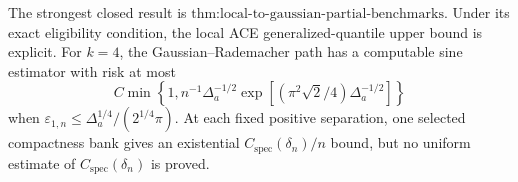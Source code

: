 The strongest closed result is \(\text{thm:local-to-gaussian-partial-benchmarks}\).  Under its exact eligibility condition, the local ACE generalized-quantile upper bound is explicit.  For \(k=4\), the Gaussian--Rademacher path has a computable sine estimator with risk at most
\[
 C\min\!\left\{1,n^{-1}\Delta_a^{-1/2}
 \exp\!\left[(\pi^2\sqrt2/4)\Delta_a^{-1/2}\right]\right\}
\]
when \(\varepsilon_{1,n}\le\Delta_a^{1/4}/(2^{1/4}\pi)\).  At each fixed positive separation, one selected compactness bank gives an existential \(C_{\mathrm{spec}}(\delta_n)/n\) bound, but no uniform estimate of \(C_{\mathrm{spec}}(\delta_n)\) is proved.